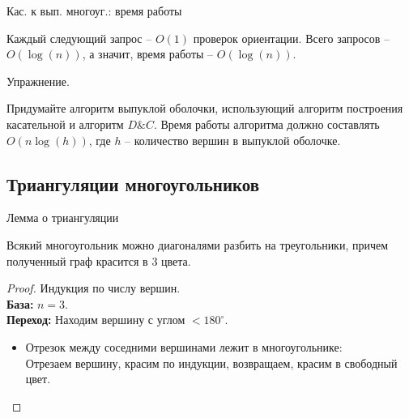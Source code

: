     \begin{frame}{Кас. к вып. многоуг.: время работы}

        Каждый следующий запрос -- $O(1)$ проверок ориентации.
        Всего запросов -- $O(\log(n))$, а значит, время работы -- $O(\log(n))$.
        
        \vspace{5mm}
        
        \begin{block}{Упражнение.}

            Придумайте алгоритм выпуклой оболочки, использующий алгоритм построения касательной и алгоритм
            $D\&C$. Время работы алгоритма должно составлять $O(n\log(h))$, где $h$ -- количество вершин  в выпуклой оболочке.

        \end{block}

    \end{frame}

    \subsection{Триангуляции многоугольников}

    \begin{frame}{Лемма о триангуляции}

    \vspace{2mm}
    \begin{lm}[О триангуляции]\hypertarget{trianglemm}{}

        Всякий многоугольник можно диагоналями разбить на треугольники, причем полученный граф красится в 3 цвета.

    \end{lm}

    \begin{proof}\let\qed\relax
        Индукция по числу вершин.\\

        \textbf{База:} $n = 3$.\\
        \textbf{Переход:} Находим вершину с  углом $<180^{\circ}$.\\

        \begin{itemize}

            \item Отрезок между соседними  вершинами лежит в многоугольнике:\\
            Отрезаем вершину, красим по индукции, возвращаем, красим в свободный цвет.

        \end{itemize}

    \end{proof}

    \end{frame}

